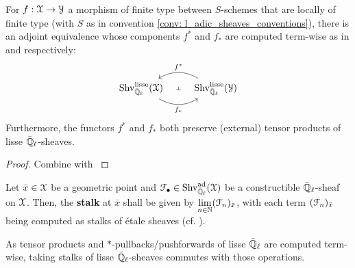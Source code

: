                 \begin{proposition} \label{prop: *_pullbacks_and_pushforwards_of_l_adic_sheaves}
                    For $f: \mathcal{X} \to \mathcal{Y}$ a morphism of finite type between $S$-schemes that are locally of finite type (with $S$ as in convention \ref{conv: l_adic_sheaves_conventions}), there is an adjoint equivalence whose components $f^*$ and $f_*$ are computed term-wise as in \cite[\href{https://stacks.math.columbia.edu/tag/03PZ}{Tag 03PZ}]{stacks} and  \cite[\href{https://stacks.math.columbia.edu/tag/03PV}{Tag 03PV}]{stacks} respectively:
                        $$
                            \begin{tikzcd}
                            	{\Shv_{\bar{\Q}_{\ell}}^{\lisse}(\calX)} & {\Shv_{\bar{\Q}_{\ell}}^{\lisse}(\calY)}
                            	\arrow[""{name=0, anchor=center, inner sep=0}, "{f_*}"', bend right, from=1-1, to=1-2]
                            	\arrow[""{name=1, anchor=center, inner sep=0}, "{f^*}"', bend right, from=1-2, to=1-1]
                            	\arrow["\dashv"{anchor=center, rotate=-90}, draw=none, from=1, to=0]
                            \end{tikzcd}
                        $$
                    Furthermore, the functors $f^*$ and $f_*$ both preserve (external) tensor products of lisse $\bar{\mathbb{Q}}_{\ell}$-sheaves.
                \end{proposition}
                    \begin{proof}
                        Combine \cite[Proposition 8.3]{laszlo_olsson_adic_sheaves_on_artin_stacks_2} with \cite[Theorem II.7.1]{kiehl_weissauer_weil_conjecture_perverse_sheaves_and_l_adic_fourier_transform}
                    \end{proof}
                
                \begin{definition} \label{def: stalks_of_constructible_adic_sheaves}
                    \cite[Definition 1.4.4.3]{conrad_etale_cohomology} Let $\bar{x} \in \mathcal{X}$ be a geometric point and $\mathcal{F}_{\bullet} \in \mathrm{Shv}_{\bar{\mathbb{Q}}_{\ell}}^{\mathrm{ad}}(\mathcal{X})$ be a constructible $\bar{\mathbb{Q}}_{\ell}$-sheaf on $\mathcal{X}$. Then, the \textbf{stalk} at $\bar{x}$ shall be given by $\underset{n \in \mathbb{N}}{\operatorname{lim}} (\mathcal{F}_n)_{\bar{x}}$, with each term $(\mathcal{F}_n)_{\bar{x}}$ being computed as stalks of \'etale sheaves (cf. \cite[\href{https://stacks.math.columbia.edu/tag/040R}{Tag 040R}]{stacks}).
                \end{definition}
                \begin{remark}
                    As tensor products and $*$-pullbacks/pushforwards of lisse $\bar{\mathbb{Q}}_{\ell}$ are computed term-wise, taking stalks of lisse $\bar{\mathbb{Q}}_{\ell}$-sheaves commutes with those operations.
                \end{remark}
                
